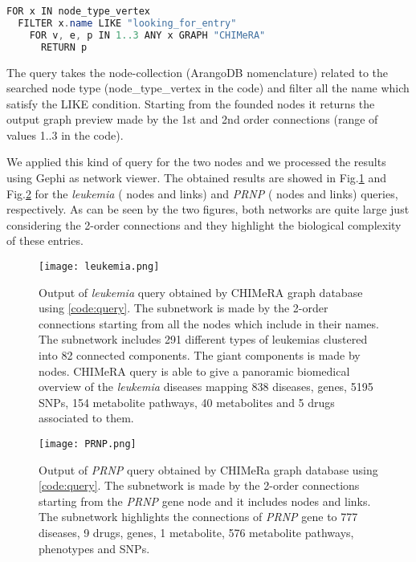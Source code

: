 \documentclass{standalone}
\begin{document}
\lstset{style=Java}
\begin{lstlisting}[language=Java, caption=CHIMeRA 2-order connections query, label=code:query]
FOR x IN node_type_vertex
  FILTER x.name LIKE "looking_for_entry"
    FOR v, e, p IN 1..3 ANY x GRAPH "CHIMeRA"
      RETURN p
\end{lstlisting}

The query takes the node-collection (\textsf{ArangoDB} nomenclature) related to the searched node type (\textsf{node\_type\_vertex} in the code) and filter all the name which satisfy the \textsf{LIKE} condition.
Starting from the founded nodes it returns the output graph preview made by the 1st and 2nd order connections (range of values \textsf{1..3} in the code).

We applied this kind of query for the two nodes and we processed the results using \textsf{Gephi} as network viewer.
The obtained results are showed in Fig.\ref{fig:leukemia} and Fig.\ref{fig:prnp} for the \emph{leukemia} ( nodes and  links) and \emph{PRNP} ( nodes and  links) queries, respectively.
As can be seen by the two figures, both networks are quite large just considering the 2-order connections and they highlight the biological complexity of these entries.

\begin{figure}[htbp]
\centering
\texttt{[image: leukemia.png]}
\caption{Output of \emph{leukemia} query obtained by \textsf{CHIMeRA} graph database using \ref{code:query}.
The subnetwork is made by the 2-order connections starting from all the nodes which include  in their names.
The subnetwork includes 291 different types of leukemias clustered into 82 connected components.
The giant components is made by  nodes.
\textsf{CHIMeRA} query is able to give a panoramic biomedical overview of the \emph{leukemia} diseases mapping 838 diseases,  genes, 5195 SNPs, 154 metabolite pathways, 40 metabolites and 5 drugs associated to them.
}
\label{fig:leukemia}
\end{figure}

\begin{figure}[htbp]
\centering
\texttt{[image: PRNP.png]}
\caption{Output of \emph{PRNP} query obtained by \textsf{CHIMeRa} graph database using \ref{code:query}.
The subnetwork is made by the 2-order connections starting from the \emph{PRNP} gene node and it includes  nodes and  links.
The subnetwork highlights the connections of \emph{PRNP} gene to 777 diseases, 9 drugs,  genes, 1 metabolite, 576 metabolite pathways,  phenotypes and  SNPs.
}
\label{fig:prnp}
\end{figure}
\end{document}
